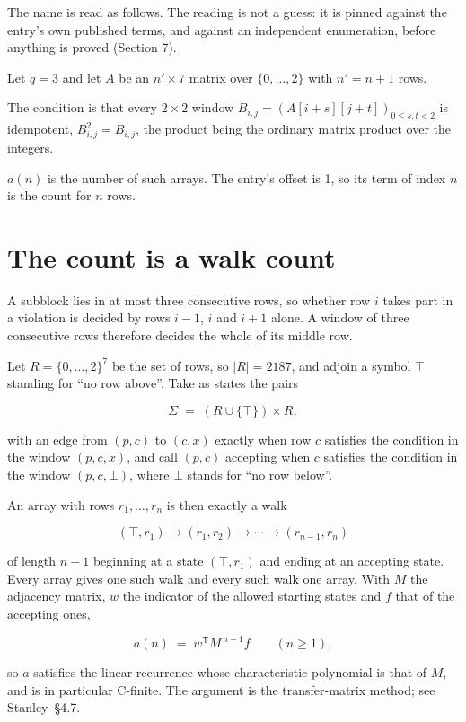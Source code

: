 \documentclass[11pt]{article}
\theoremstyle{definition}
\begin{document}
The name is read as follows. The reading is not a guess: it is pinned against the entry's own published terms, and against an independent enumeration, before anything is proved (Section 7).

Let $q = 3$ and let $A$ be an $n' \times 7$ matrix over $\{0,\dots,2\}$ with $n' = n + 1$ rows.

The condition is that every $2 \times 2$ window $B_{i,j} = (A[i{+}s][j{+}t])_{0 \le s,t < 2}$ is idempotent, $B_{i,j}^2 = B_{i,j}$, the product being the ordinary matrix product over the integers.

$a(n)$ is the number of such arrays. The entry's offset is 1, so its term of index $n$ is the count for $n$ rows.

\section{The count is a walk count}

A subblock lies in at most three consecutive rows, so whether row $i$ takes part in a violation is decided by rows $i-1$, $i$ and $i+1$ alone. A window of three consecutive rows therefore decides the whole of its middle row.

Let $R = \{0,\dots,2\}^{7}$ be the set of rows, so $|R| = 2187$, and adjoin a symbol $\top$ standing for ``no row above''. Take as states the pairs

\[\Sigma \;=\; (R \cup \{\top\}) \times R,\]

with an edge from $(p,c)$ to $(c,x)$ exactly when row $c$ satisfies the condition in the window $(p,c,x)$, and call $(p,c)$ accepting when $c$ satisfies the condition in the window $(p,c,\bot)$, where $\bot$ stands for ``no row below''.

An array with rows $r_1,\dots,r_n$ is then exactly a walk

\[(\top,r_1) \to (r_1,r_2) \to \cdots \to (r_{n-1},r_n)\]

of length $n-1$ beginning at a state $(\top,r_1)$ and ending at an accepting state. Every array gives one such walk and every such walk one array. With $M$ the adjacency matrix, $w$ the indicator of the allowed starting states and $f$ that of the accepting ones,

\[a(n) \;=\; w^{\mathsf T} M^{\,n-1} f \qquad (n \ge 1),\]

so $a$ satisfies the linear recurrence whose characteristic polynomial is that of $M$, and is in particular C-finite. The argument is the transfer-matrix method; see Stanley~\S4.7.
\end{document}
